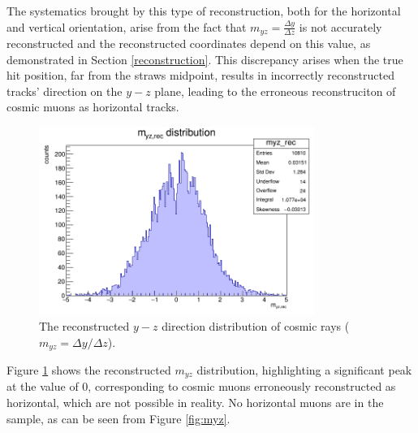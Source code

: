 The systematics brought by this type of reconstruction, both for 
the horizontal and vertical orientation, arise from the fact that $m_{yz}=\frac{\Delta y}{\Delta z}$ 
is not accurately reconstructed and the reconstructed coordinates depend on this 
value, as demonstrated in Section \ref{reconstruction}. 
This discrepancy arises when the true hit position, far from the straws midpoint, 
results in incorrectly reconstructed tracks' direction on the $y-z$ plane, leading to the erroneous 
reconstruciton of cosmic muons as horizontal tracks.
\begin{figure}[!h]
    \centering
    \includegraphics[width=0.8\textwidth]{figures/png/myz_rec.png}
    \caption[The reconstructed $y-z$ direction distribution of cosmic rays.]{The reconstructed $y-z$ direction distribution of cosmic rays ($m_{yz}=\Delta y /\Delta z$).}
    \label{fig:myzrec}
  \end{figure}
Figure \ref{fig:myzrec} shows the reconstructed $m_{yz}$ distribution, highlighting 
a significant peak at the value of 0, corresponding to cosmic muons erroneously 
reconstructed as horizontal, which are not possible in reality. 
No horizontal muons are in the sample, as can be seen from Figure \ref{fig:myz}.

